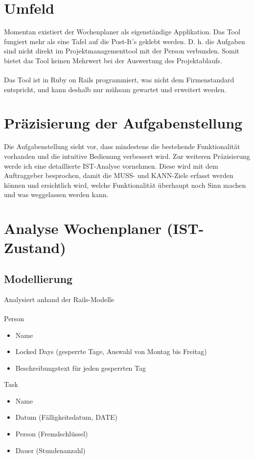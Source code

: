 \section{Umfeld}
Momentan existiert der Wochenplaner als eigenständige Applikation.
Das Tool fungiert mehr als eine Tafel auf die Post-It's geklebt werden. D. h. die Aufgaben sind nicht direkt im Projektmanagementtool mit der Person verbunden.
Somit bietet das Tool keinen Mehrwert bei der Auswertung des Projektablaufs.\\
\\
Das Tool ist in Ruby on Rails programmiert, was nicht dem Firmenstandard entspricht, und kann deshalb nur mühsam gewartet und erweitert werden.

\section{Präzisierung der Aufgabenstellung}
Die Aufgabenstellung sieht vor, dass mindestens die bestehende Funktionalität vorhanden und die intuitive Bedienung verbessert wird. 
Zur weiteren Präzisierung werde ich eine detaillierte IST-Analyse vornehmen. Diese wird mit dem Auftraggeber besprochen, 
damit die MUSS- und KANN-Ziele erfasst werden können und ersichtlich wird, welche Funktionalität überhaupt noch Sinn machen und was weggelassen werden kann.

\section{Analyse Wochenplaner (IST-Zustand)}

\subsection{Modellierung}
    Analysiert anhand der Rails-Modelle\\
    \\
    Person
    \begin{itemize}
        \item Name
        \item Locked Days (gesperrte Tage, Auswahl von Montag bis Freitag)
        \item Beschreibungstext für jeden gesperrten Tag
    \end{itemize}
    Task
    \begin{itemize}
        \item Name
        \item Datum (Fälligkeitsdatum, DATE)
        \item Person (Fremdschlüssel)
        \item Dauer (Stundenanzahl)
    \end{itemize}

